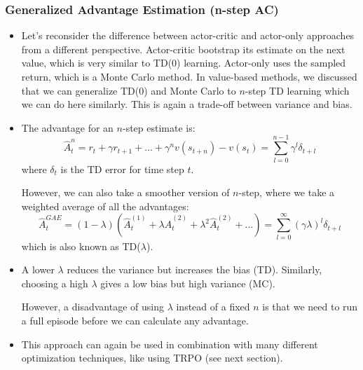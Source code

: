\subsubsection{Generalized Advantage Estimation (n-step AC)}
\begin{itemize}
	\item Let's reconsider the difference between actor-critic and actor-only approaches from a different perspective. Actor-critic bootstrap its estimate on the next value, which is very similar to TD(0) learning. Actor-only uses the sampled return, which is a Monte Carlo method. In value-based methods, we discussed that we can generalize TD(0) and Monte Carlo to $n$-step TD learning which we can do here similarly. This is again a trade-off between variance and bias. %
	\item The advantage for an $n$-step estimate is:
	$$\hat{A}_t^n = r_t + \gamma r_{t+1} + ... + \gamma^n v(s_{t+n}) - v(s_t) = \sum_{l=0}^{n-1}\gamma^{l}\delta_{t+l}$$
	where $\delta_{t}$ is the TD error for time step $t$. 
	 
	However, we can also take a smoother version of $n$-step, where we take a weighted average of all the advantages:
	$$\hat{A}_t^{GAE} = (1-\lambda)\left(\hat{A}_t^{(1)} + \lambda \hat{A}_t^{(2)} + \lambda^2 \hat{A}_t^{(2)} + ...\right) = \sum_{l=0}^{\infty} (\gamma \lambda)^{l}\delta_{t+l}$$
	which is also known as TD($\lambda$).
	\item A lower $\lambda$ reduces the variance but increases the bias (TD). Similarly, choosing a high $\lambda$ gives a low bias but high variance (MC).
	
	However, a disadvantage of using $\lambda$ instead of a fixed $n$ is that we need to run a full episode before we can calculate any advantage.
	\item This approach can again be used in combination with many different optimization techniques, like using TRPO (see next section). 
\end{itemize}
